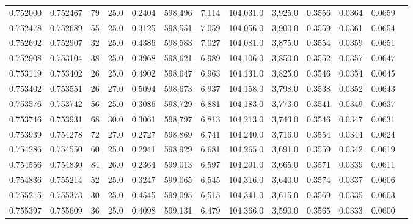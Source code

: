 \begin{tabular}{rrrrrrrrrrrrr}
0.752000 & 0.752467 &    79 & 25.0 &                                     0.2404 & 598,496 &   7,114 & 104,031.0 &   3,925.0 & 0.3556 & 0.0364 & 0.0659 \\
0.752478 & 0.752689 &    55 & 25.0 &                                     0.3125 & 598,551 &   7,059 & 104,056.0 &   3,900.0 & 0.3559 & 0.0361 & 0.0654 \\
0.752692 & 0.752907 &    32 & 25.0 &                                     0.4386 & 598,583 &   7,027 & 104,081.0 &   3,875.0 & 0.3554 & 0.0359 & 0.0651 \\
0.752908 & 0.753104 &    38 & 25.0 &                                     0.3968 & 598,621 &   6,989 & 104,106.0 &   3,850.0 & 0.3552 & 0.0357 & 0.0647 \\
0.753119 & 0.753402 &    26 & 25.0 &                                     0.4902 & 598,647 &   6,963 & 104,131.0 &   3,825.0 & 0.3546 & 0.0354 & 0.0645 \\
0.753402 & 0.753551 &    26 & 27.0 &                                     0.5094 & 598,673 &   6,937 & 104,158.0 &   3,798.0 & 0.3538 & 0.0352 & 0.0643 \\
0.753576 & 0.753742 &    56 & 25.0 &                                     0.3086 & 598,729 &   6,881 & 104,183.0 &   3,773.0 & 0.3541 & 0.0349 & 0.0637 \\
0.753746 & 0.753931 &    68 & 30.0 &                                     0.3061 & 598,797 &   6,813 & 104,213.0 &   3,743.0 & 0.3546 & 0.0347 & 0.0631 \\
0.753939 & 0.754278 &    72 & 27.0 &                                     0.2727 & 598,869 &   6,741 & 104,240.0 &   3,716.0 & 0.3554 & 0.0344 & 0.0624 \\
0.754286 & 0.754550 &    60 & 25.0 &                                     0.2941 & 598,929 &   6,681 & 104,265.0 &   3,691.0 & 0.3559 & 0.0342 & 0.0619 \\
0.754556 & 0.754830 &    84 & 26.0 &                                     0.2364 & 599,013 &   6,597 & 104,291.0 &   3,665.0 & 0.3571 & 0.0339 & 0.0611 \\
0.754836 & 0.755214 &    52 & 25.0 &                                     0.3247 & 599,065 &   6,545 & 104,316.0 &   3,640.0 & 0.3574 & 0.0337 & 0.0606 \\
0.755215 & 0.755373 &    30 & 25.0 &                                     0.4545 & 599,095 &   6,515 & 104,341.0 &   3,615.0 & 0.3569 & 0.0335 & 0.0603 \\
0.755397 & 0.755609 &    36 & 25.0 &                                     0.4098 & 599,131 &   6,479 & 104,366.0 &   3,590.0 & 0.3565 & 0.0333 & 0.0600 \\

\end{tabular}
